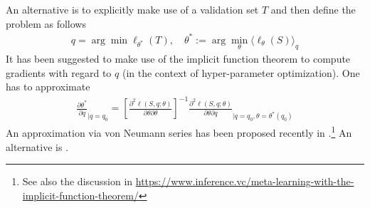 \documentclass[12pt,a4paper]{article}
\begin{document}
An alternative is to explicitly make use of a validation set $T$ and then define the problem as follows
\begin{align}
q = \arg\min \ell_{\theta^*}(T),\quad \theta^* := \arg\min_\theta \langle \ell_\theta(S) \rangle_q
\end{align}
It has been suggested to make use of the implicit function theorem to compute gradients with regard to $q$ (in the context of hyper-parameter optimization). One has to approximate
\begin{align}
\frac{\partial \theta^*}{\partial q}_{\Big| q=q_0}= \left[ \frac{\partial^2 \ell(S,q;\theta)}{\partial \theta \partial \theta} \right]^{-1}\frac{\partial^2 \ell(S,q;\theta)}{\partial \theta \partial q}_{\Big| q = q_0, \theta = \theta^*(q_0)}
\end{align}
An approximation via von Neumann series has been proposed recently in \cite{lorraine2019optimizing}.\footnote{See also the discussion in \url{https://www.inference.vc/meta-learning-with-the-implicit-function-theorem/}} An alternative is \cite{rajeswaran2019meta}.




\end{document}
